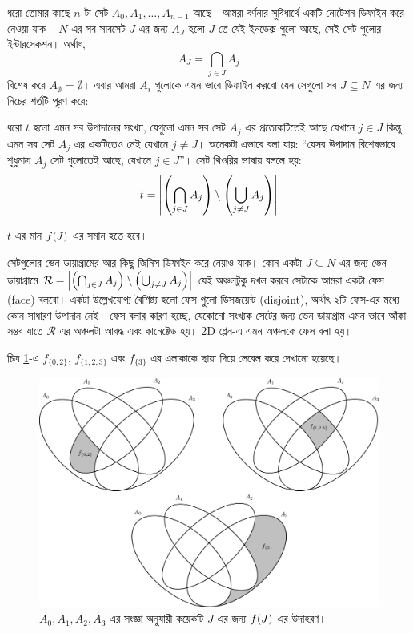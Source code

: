 ধরো তোমার কাছে $n$-টা সেট $A_0, A_1, \ldots, A_{n-1}$ আছে। আমরা বর্ণনার
সুবিধার্থে একটি নোটেশন ডিফাইন করে নেওয়া যাক -- $N$ এর সব সাবসেট
$J$ এর জন্য $A_J$ হলো $J$-তে যেই ইনডেক্স গুলো আছে,
সেই সেট গুলোর ইন্টারসেকশন। অর্থাৎ,
\[
  A_J = \bigcap_{j \in J} A_j
\]
বিশেষ করে $A_\emptyset = \emptyset$।
এবার আমরা $A_i$ গুলোকে এমন ভাবে ডিফাইন করবো যেন সেগুলো সব $J
\subseteq N$ এর জন্য নিচের শর্তটি পূরণ করে:
\begin{bigcondition}
  ধরো $t$ হলো এমন সব উপাদানের সংখ্যা, যেগুলো এমন সব সেট $A_j$ এর
  প্রত্যেকটিতেই আছে যেখানে $j \in J$ কিন্তু এমন সব সেট $A_j$ এর
  একটিতেও নেই যেখানে $j \ne J$। অনেকটা
  এভাবে বলা যায়: ``যেসব উপাদান বিশেষভাবে শুধুমাত্র $A_j$ সেট গুলোতেই আছে,
  যেখানে $j \in J$''। সেট থিওরির ভাষায় বললে হয়:
  \[
    t = \left|  \left ( \bigcap_{j \in J} A_j \right ) \setminus
    \left ( \bigcup_{j \ne J} A_j \right )  \right|
  \]

  $t$ এর মান $f(J)$ এর সমান হতে হবে।
\end{bigcondition}

সেটগুলোর ভেন ডায়াগ্রামের আর কিছু জিনিস ডিফাইন করে নেয়াও যাক। কোন একটা $J
\subseteq N$ এর জন্য ভেন ডায়াগ্রামে $\mathcal{R} = \left|  \left ( \bigcap_{j \in
J} A_j \right )
\setminus \left ( \bigcup_{j \ne J} A_j \right )  \right|$ যেই অঞ্চলটুকু দখল করবে সেটাকে আমরা
একটা ফেস (face) বলবো। একটা উল্লেখযোগ্য বৈশিষ্ট্য হলো ফেস গুলো ডিসজয়েন্ট
(disjoint), অর্থাৎ ২টি ফেস-এর মধ্যে কোন সাধারণ উপাদান নেই। ফেস বলার কারণ
হচ্ছে, যেকোনো সংখ্যক সেটের জন্য ভেন ডায়াগ্রাম এমন ভাবে আঁকা সম্ভব যাতে
$\mathcal{R}$ এর
অঞ্চলটা আবদ্ধ এবং কানেক্টেড হয়। 2D প্লেন-এ এমন অঞ্চলকে ফেস বলা হয়।

চিত্র \ref{two_f_example}-এ $f_{\{0, 2\}}$, $f_{\{1,2,3\}}$ এবং
$f_{\{3\}}$ এর এলাকাকে ছায়া দিয়ে লেবেল করে দেখানো হয়েছে।
\begin{figure}[!ht]
  \centering
  \includegraphics[width=\textwidth]{./img/sos-dp/4set/two_f_example.pdf}
  \caption{$A_0, A_1, A_2, A_3$ এর সংজ্ঞা অনুযায়ী কয়েকটি $J$ এর জন্য
  $f(J)$ এর উদাহরণ।}
  \label{two_f_example}
\end{figure}

